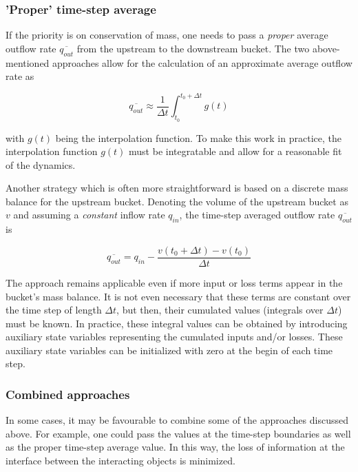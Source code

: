 \subsubsection*{'Proper' time-step average}

If the priority is on conservation of mass, one needs to pass a \emph{proper} average outflow rate $\overline{q_{out}}$ from the upstream to the downstream bucket. The two above-mentioned approaches allow for the calculation of an approximate average outflow rate as

\begin{equation*}
  \overline{q_{out}} \approx \frac{1}{\Delta t}\int_{t_0}^{t_0+\Delta t}g(t)
\end{equation*}

with $g(t)$ being the interpolation function. To make this work in practice, the interpolation function $g(t)$ must be integratable and allow for a reasonable fit of the dynamics.

Another strategy which is often more straightforward is based on a discrete mass balance for the upstream bucket. Denoting the volume of the upstream bucket as $v$ and assuming a \emph{constant} inflow rate $q_{in}$, the time-step averaged outflow rate $\overline{q_{out}}$ is

\begin{equation*}
  \overline{q_{out}} = q_{in} - \frac{v(t_0 + \Delta t) - v(t_0)}{\Delta t}
\end{equation*}

The approach remains applicable even if more input or loss terms appear in the bucket's mass balance. It is not even necessary that these terms are constant over the time step of length $\Delta t$, but then, their cumulated values (integrals over $\Delta t$) must be known. In practice, these integral values can be obtained by introducing auxiliary state variables representing the cumulated inputs and/or losses. These auxiliary state variables can be initialized with zero at the begin of each time step.

\subsubsection*{Combined approaches}

In some cases, it may be favourable to combine some of the approaches discussed above. For example, one could pass the values at the time-step boundaries as well as the proper time-step average value. In this way, the loss of information at the interface between the interacting objects is minimized.
